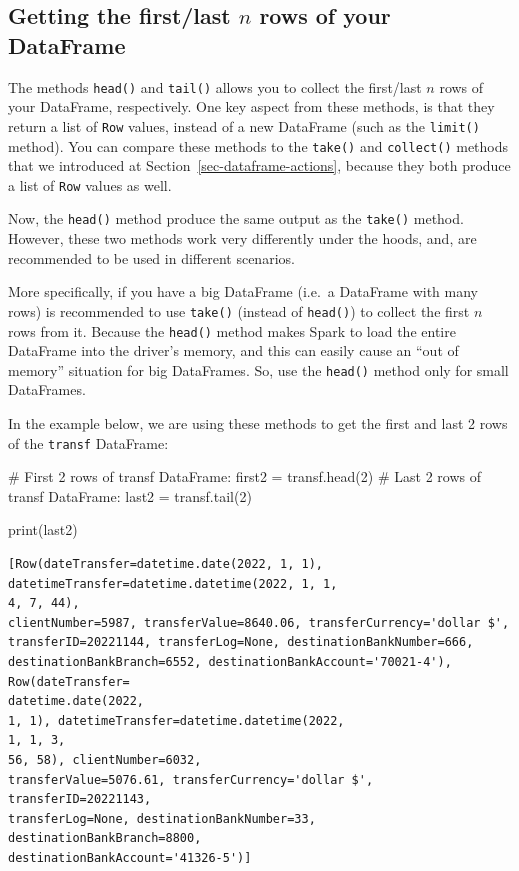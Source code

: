 \documentclass[
  11pt,
  letterpaper,
  DIV=11,
  numbers=noendperiod]{scrreprt}
\newenvironment{Shaded}{\begin{snugshade}}{\end{snugshade}}
\newcommand{\BuiltInTok}[1]{\textcolor[rgb]{0.00,0.23,0.31}{#1}}
\newcommand{\CommentTok}[1]{\textcolor[rgb]{0.37,0.37,0.37}{#1}}
\newcommand{\DecValTok}[1]{\textcolor[rgb]{0.68,0.00,0.00}{#1}}
\newcommand{\NormalTok}[1]{\textcolor[rgb]{0.00,0.23,0.31}{#1}}
\newcommand{\OperatorTok}[1]{\textcolor[rgb]{0.37,0.37,0.37}{#1}}
\begin{document}
\hypertarget{getting-the-firstlast-n-rows-of-your-dataframe}{%
\subsection{\texorpdfstring{Getting the first/last \(n\) rows of your
DataFrame}{Getting the first/last n rows of your DataFrame}}\label{getting-the-firstlast-n-rows-of-your-dataframe}}

The methods \texttt{head()} and \texttt{tail()} allows you to collect
the first/last \(n\) rows of your DataFrame, respectively. One key
aspect from these methods, is that they return a list of \texttt{Row}
values, instead of a new DataFrame (such as the \texttt{limit()}
method). You can compare these methods to the \texttt{take()} and
\texttt{collect()} methods that we introduced at
Section~\ref{sec-dataframe-actions}, because they both produce a list of
\texttt{Row} values as well.

Now, the \texttt{head()} method produce the same output as the
\texttt{take()} method. However, these two methods work very differently
under the hoods, and, are recommended to be used in different scenarios.

More specifically, if you have a big DataFrame (i.e.~a DataFrame with
many rows) is recommended to use \texttt{take()} (instead of
\texttt{head()}) to collect the first \(n\) rows from it. Because the
\texttt{head()} method makes Spark to load the entire DataFrame into the
driver's memory, and this can easily cause an ``out of memory''
situation for big DataFrames. So, use the \texttt{head()} method only
for small DataFrames.

In the example below, we are using these methods to get the first and
last 2 rows of the \texttt{transf} DataFrame:

\begin{Shaded}
\begin{Highlighting}[]
\CommentTok{\# First 2 rows of \textasciigrave{}transf\textasciigrave{} DataFrame:}
\NormalTok{first2 }\OperatorTok{=}\NormalTok{ transf.head(}\DecValTok{2}\NormalTok{)}
\CommentTok{\# Last 2 rows of \textasciigrave{}transf\textasciigrave{} DataFrame:}
\NormalTok{last2 }\OperatorTok{=}\NormalTok{ transf.tail(}\DecValTok{2}\NormalTok{)}

\BuiltInTok{print}\NormalTok{(last2)}
\end{Highlighting}
\end{Shaded}

\begin{verbatim}
[Row(dateTransfer=datetime.date(2022, 1, 1),
datetimeTransfer=datetime.datetime(2022, 1, 1,
4, 7, 44),
clientNumber=5987, transferValue=8640.06, transferCurrency='dollar $',
transferID=20221144, transferLog=None, destinationBankNumber=666,
destinationBankBranch=6552, destinationBankAccount='70021-4'), Row(dateTransfer=
datetime.date(2022,
1, 1), datetimeTransfer=datetime.datetime(2022,
1, 1, 3,
56, 58), clientNumber=6032,
transferValue=5076.61, transferCurrency='dollar $', transferID=20221143,
transferLog=None, destinationBankNumber=33, destinationBankBranch=8800,
destinationBankAccount='41326-5')]
\end{verbatim}
\end{document}
